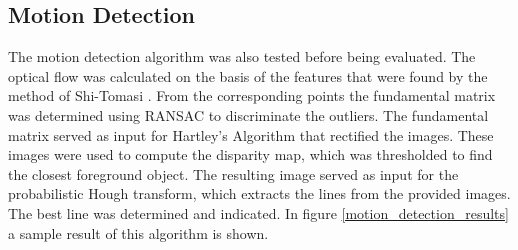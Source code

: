 \documentclass[a4paper]{article}
\begin{document}
\subsection{Motion Detection}
The motion detection algorithm was also tested before being evaluated. The optical flow was calculated on the basis of the features that were found by the method of Shi-Tomasi \cite{Shi1994}. From the corresponding points the fundamental matrix was determined using RANSAC to discriminate the outliers. The fundamental matrix served as input for Hartley's Algorithm that rectified the images. These images were used to compute the disparity map, which was thresholded to find the closest foreground object. The resulting image served as input for the probabilistic Hough transform, which extracts the lines from the provided images. The best line was determined and indicated. In figure \ref{motion_detection_results} a sample result of this algorithm is shown.
\end{document}
